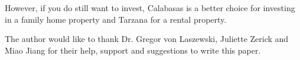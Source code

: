 \documentclass[sigconf]{acmart}
\begin{document}
However, if you do still want to invest, Calabasas is a better choice for investing in a family home property and Tarzana for a rental property.

\begin{acks}

  The author would like to thank Dr. Gregor von Laszewski, Juliette Zerick and Miao Jiang for their help, support and suggestions to write this paper.

\end{acks}


 
\end{document}
